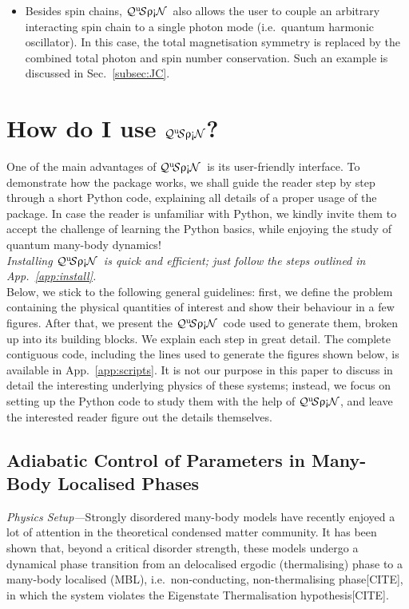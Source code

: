 \documentclass{SciPost}
\newcommand\0{\scalebox{-1}[1]{0}}
\newcommand{\qspin}{$\mathcal{Q}^{\mathrm{u}}\!\mathcal{S}\uprho\mathrm{\text{\textexclamdown}}\mathcal{N}$}
\begin{document}
\begin{itemize}
	\item Besides spin chains, \qspin\ also allows the user to couple an arbitrary interacting spin chain to a single photon mode (i.e.~quantum harmonic oscillator). In this case, the total magnetisation symmetry is replaced by the combined total photon and spin number conservation. Such an example is discussed in Sec.~\ref{subsec:JC}.
\end{itemize}
 


\section{How do I use \qspin?}
\label{sec:examples}

One of the main advantages of \qspin\ is its user-friendly interface. To demonstrate how the package works, we shall guide the reader step by step through a short Python code, explaining all details of a proper usage of the package. In case the reader is unfamiliar with Python, we kindly invite them to accept the challenge of learning the Python basics, while enjoying the study of quantum many-body dynamics! \\

\emph{Installing \qspin\ is quick and efficient; just follow the steps outlined in App.~\ref{app:install}.}\\

\noindent Below, we stick to the following general guidelines: first, we define the problem containing the physical quantities of interest and show their behaviour in a few figures. After that, we present the \qspin\ code used to generate them, broken up into its building blocks. We explain each step in great detail. The complete contiguous code, including the lines used to generate the figures shown below, is available in App.~\ref{app:scripts}. It is not our purpose in this paper to discuss in detail the interesting underlying physics of these systems; instead, we focus on setting up the Python code to study them with the help of \qspin, and leave the interested reader figure out the details themselves.

\subsection{Adiabatic Control of Parameters in Many-Body Localised Phases}
\label{subsec:MBL}

\emph{Physics Setup---}Strongly  disordered many-body models have recently enjoyed a lot of attention in the theoretical condensed matter community. It has been shown that, beyond a critical disorder strength, these models undergo a dynamical phase transition from an delocalised ergodic (thermalising) phase to a many-body localised (MBL), i.e.~non-conducting, non-thermalising phase[CITE], in which the system violates the Eigenstate Thermalisation hypothesis[CITE]. 
\end{document}
